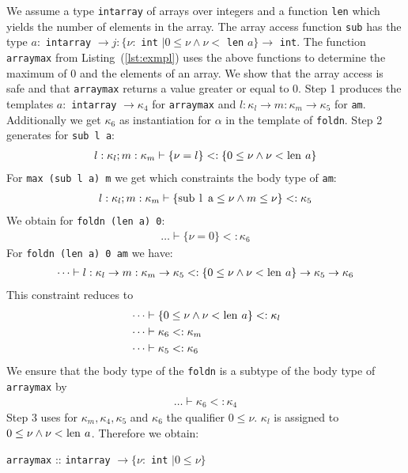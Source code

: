 \documentclass[a4paper,UKenglish]{lipics-v2016}
\begin{document}
We assume a type \lstinline{intarray} of arrays over integers and a function \lstinline{len} which yields the number of elements in the array.
The array access function \lstinline{sub} has the type
$a:$ \lstinline{intarray} $\rightarrow j: \{\nu:$ \lstinline{int} $\mid 0 \le \nu \land \nu < $ \lstinline{len} $a\} \rightarrow$ \lstinline{int}.
The function \lstinline{arraymax} from Listing~(\ref{lst:exmpl}) uses the above functions to determine the maximum of 0 and the elements of an array.
We show that the array access is safe and that \lstinline{arraymax} returns a value greater or equal to 0.
Step 1 produces the templates $a:$ \lstinline{intarray} $\rightarrow \kappa_4$ for \lstinline{arraymax} and $l: \kappa_l \rightarrow m: \kappa_m \rightarrow \kappa_5$ for \lstinline{am}.
Additionally we get $\kappa_6$ as instantiation for $\alpha$ in the template of \lstinline{foldn}.
Step 2 generates for \lstinline{sub l a}:
\begin{align}
    l: \kappa_l; m: \kappa_m \vdash \{\nu = l\} <: \{0 \le \nu \land \nu < \text{\lstinline|len| } a\}
\end{align}
For \lstinline{max (sub l a) m} we get which constraints the body type of \lstinline{am}:
\begin{align}
    l: \kappa_l; m: \kappa_m \vdash \{\text{\lstinline|sub l a|} \le \nu \land m \le \nu \} <: \kappa_5
\end{align}
We obtain for \lstinline{foldn (len a) 0}:
\begin{align}
    \dots \vdash \{ \nu = 0 \} <: \kappa_6
\end{align}
For \lstinline{foldn (len a) 0 am} we have:
\begin{align}
    \dots \vdash l: \kappa_l \rightarrow m: \kappa_m \rightarrow \kappa_5 <: \{0 \le \nu \land \nu < \text{\lstinline|len| } a\} \rightarrow \kappa_5 \rightarrow \kappa_6
\end{align}
This constraint reduces to
\begin{align}
    & \dots \vdash \{0 \le \nu \land \nu < \text{\lstinline|len| } a\} <: \kappa_l \\
    & \dots \vdash \kappa_6 <: \kappa_m \\
    & \dots \vdash \kappa_5 <: \kappa_6
\end{align}
We ensure that the body type of the \lstinline{foldn} is a subtype of the body type of \lstinline{arraymax} by
\begin{align}
    \dots \vdash \kappa_6 <: \kappa_4
\end{align}
Step 3 uses for $\kappa_m, \kappa_4, \kappa_5$ and $\kappa_6$ the qualifier $0 \le \nu$.
$\kappa_l$ is assigned to $0 \le \nu \land \nu < \text{\lstinline|len| } a$.
Therefore we obtain:
\begin{center}
    \lstinline{arraymax} :: \lstinline{intarray} $\rightarrow \{ \nu:$ \lstinline{int} $\mid 0 \le \nu \}$
\end{center}
\end{document}
